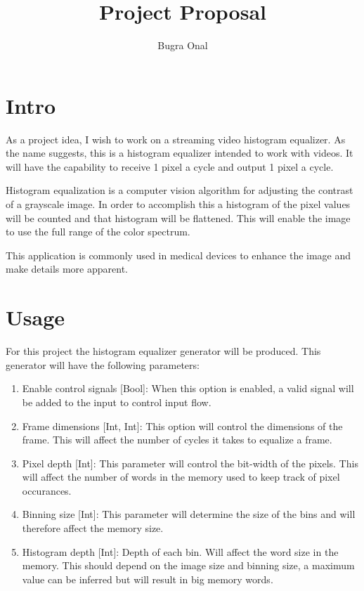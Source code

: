 \documentclass{article}
\title{Project Proposal}
\author{Bugra Onal}
\begin{document}
    \maketitle
    \section{Intro}
        As a project idea, I wish to work on a streaming video histogram equalizer. As the name suggests, this is a histogram equalizer intended to work with videos. It will have the capability to receive 1 pixel a cycle and output 1 pixel a cycle. 

        Histogram equalization is a computer vision algorithm for adjusting the contrast of a grayscale image. In order to accomplish this a histogram of the pixel values will be counted and that histogram will be flattened. This will enable the image to use the full range of the color spectrum. 

        This application is commonly used in medical devices to enhance the image and make details more apparent.

    \section{Usage}
        For this project the histogram equalizer generator will be produced. This generator will have the following parameters:
        \begin{enumerate}
            \item Enable control signals [Bool]: When this option is enabled, a valid signal will be added to the input to control input flow. 
            \item Frame dimensions [Int, Int]: This option will control the dimensions of the frame. This will affect the number of cycles it takes to equalize a frame.
            \item Pixel depth [Int]: This parameter will control the bit-width of the pixels. This will affect the number of words in the memory used to keep track of pixel occurances. 
            \item Binning size [Int]: This parameter will determine the size of the bins and will therefore affect the memory size.
            \item Histogram depth [Int]: Depth of each bin. Will affect the word size in the memory. This should depend on the image size and binning size, a maximum value can be inferred but will result in big memory words. 
        \end{enumerate}
\end{document}
